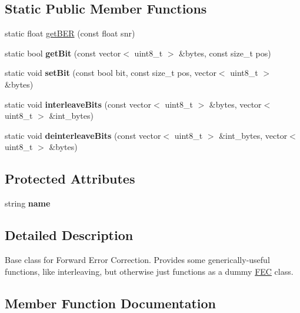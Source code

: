 \subsection*{Static Public Member Functions}
\begin{DoxyCompactItemize}
\item 
static float \hyperlink{classFEC_aaf1d4259c61fe117e086ad07871d22a3}{get\+B\+ER} (const float snr)
\item 
\mbox{\label{classFEC_a92c9959e49decd014767e50404b7d168}} 
static bool {\bfseries get\+Bit} (const vector$<$ uint8\+\_\+t $>$ \&bytes, const size\+\_\+t pos)
\item 
\mbox{\label{classFEC_aa04c28eb445a68ef068632734126529c}} 
static void {\bfseries set\+Bit} (const bool bit, const size\+\_\+t pos, vector$<$ uint8\+\_\+t $>$ \&bytes)
\item 
\mbox{\label{classFEC_a485fba806c7ca5fe2834e97e21aae0d5}} 
static void {\bfseries interleave\+Bits} (const vector$<$ uint8\+\_\+t $>$ \&bytes, vector$<$ uint8\+\_\+t $>$ \&int\+\_\+bytes)
\item 
\mbox{\label{classFEC_ae2d118ea33372eae137b01915b465b3f}} 
static void {\bfseries deinterleave\+Bits} (const vector$<$ uint8\+\_\+t $>$ \&int\+\_\+bytes, vector$<$ uint8\+\_\+t $>$ \&bytes)
\end{DoxyCompactItemize}
\subsection*{Protected Attributes}
\begin{DoxyCompactItemize}
\item 
\mbox{\label{classFEC_abb6d143bc35d00ea0d302b1f70af9851}} 
string {\bfseries name}
\end{DoxyCompactItemize}


\subsection{Detailed Description}
Base class for Forward Error Correction. Provides some generically-\/useful functions, like interleaving, but otherwise just functions as a dummy \hyperlink{classFEC}{F\+EC} class. 

\subsection{Member Function Documentation}
\mbox{\label{classFEC_aec87f2d9c2305283d226197bf76891cf}} 
